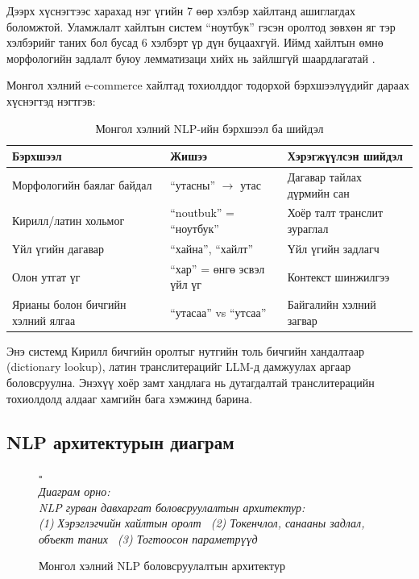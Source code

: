 \documentclass[12pt,a4paper]{report}
\newcommand{\figplaceholder}[2][7cm]{%
  \vspace{8pt}
  \begin{center}
    \colorbox{placeholderbg}{%
      \parbox[c][#1][c]{0.85\textwidth}{\centering
        {\color{darkgray!60}\Large $\square$}\\[8pt]
        {\color{darkgray}\itshape\small Диаграм орно:\\[4pt] #2}}}
  \end{center}
  \vspace{8pt}}
\begin{document}
Дээрх хүснэгтээс харахад нэг үгийн 7 өөр хэлбэр хайлтанд ашиглагдах боломжтой. Уламжлалт хайлтын систем ``ноутбук'' гэсэн оролтод зөвхөн яг тэр хэлбэрийг таних бол бусад 6 хэлбэрт үр дүн буцаахгүй. Иймд хайлтын өмнө морфологийн задлалт буюу лемматизаци хийх нь зайлшгүй шаардлагатай \cite{mongolNLP}.

Монгол хэлний e-commerce хайлтад тохиолддог тодорхой бэрхшээлүүдийг дараах хүснэгтэд нэгтгэв:

\begin{table}[H]
\centering
\caption{Монгол хэлний NLP-ийн бэрхшээл ба шийдэл}
\label{tab:mn_challenges}
\begin{tabularx}{\textwidth}{@{}lXX@{}}
\toprule
\textbf{Бэрхшээл} & \textbf{Жишээ} & \textbf{Хэрэгжүүлсэн шийдэл} \\
\midrule
Морфологийн баялаг байдал & ``утасны'' $\to$ утас & Дагавар тайлах дүрмийн сан \\
Кирилл/латин хольмог & ``noutbuk'' = ``ноутбук'' & Хоёр талт транслит зураглал \\
Үйл үгийн дагавар & ``хайна'', ``хайлт'' & Үйл үгийн задлагч \\
Олон утгат үг & ``хар'' = өнгө эсвэл үйл үг & Контекст шинжилгээ \\
Ярианы болон бичгийн хэлний ялгаа & ``утасаа'' vs ``утсаа'' & Байгалийн хэлний загвар \\
\bottomrule
\end{tabularx}
\end{table}

Энэ системд Кирилл бичгийн оролтыг нутгийн толь бичгийн хандалтаар (dictionary lookup), латин транслитерацийг LLM-д дамжуулах аргаар боловсруулна. Энэхүү хоёр замт хандлага нь дутагдалтай транслитерацийн тохиолдолд алдааг хамгийн бага хэмжинд барина.

\subsection{NLP архитектурын диаграм}

\begin{figure}[H]
  \centering
  \figplaceholder[9cm]{NLP гурван давхаргат боловсруулалтын архитектур:\\ (1) Хэрэглэгчийн хайлтын оролт \textrightarrow\ (2) Токенчлол, санааны задлал, объект таних \textrightarrow\ (3) Тогтоосон параметрүүд}
  \caption{Монгол хэлний NLP боловсруулалтын архитектур}
  \label{fig:nlp_arch}
\end{figure}
\end{document}
